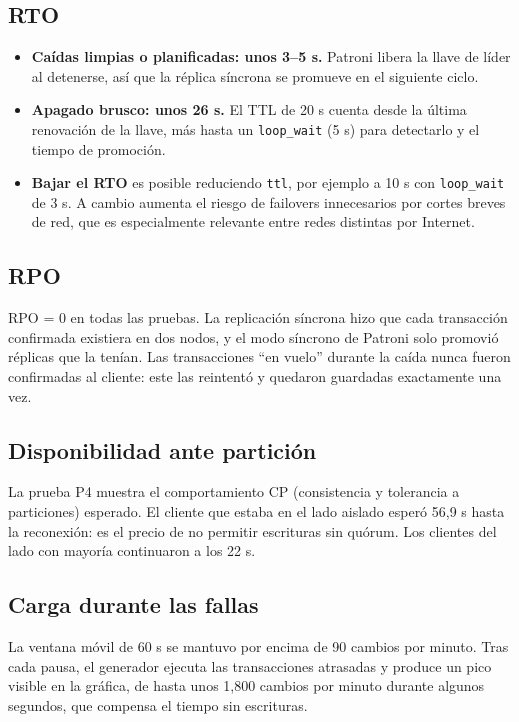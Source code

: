 \documentclass[11pt,a4paper]{article}
\newcommand{\cod}[1]{\texttt{#1}}
\begin{document}
\subsection{RTO}

\begin{itemize}
  \item \textbf{Caídas limpias o planificadas: unos 3--5 s.} Patroni libera la llave de líder al detenerse, así que la réplica síncrona se promueve en el siguiente ciclo.
  \item \textbf{Apagado brusco: unos 26 s.} El TTL de 20 s cuenta desde la última renovación de la llave, más hasta un \cod{loop\_wait} (5 s) para detectarlo y el tiempo de promoción.
  \item \textbf{Bajar el RTO} es posible reduciendo \cod{ttl}, por ejemplo a 10 s con \cod{loop\_wait} de 3 s. A cambio aumenta el riesgo de failovers innecesarios por cortes breves de red, que es especialmente relevante entre redes distintas por Internet.
\end{itemize}

\subsection{RPO}

RPO = 0 en todas las pruebas. La replicación síncrona hizo que cada transacción confirmada existiera en dos nodos, y el modo síncrono de Patroni solo promovió réplicas que la tenían. Las transacciones ``en vuelo'' durante la caída nunca fueron confirmadas al cliente: este las reintentó y quedaron guardadas exactamente una vez.

\subsection{Disponibilidad ante partición}

La prueba P4 muestra el comportamiento CP (consistencia y tolerancia a particiones) esperado. El cliente que estaba en el lado aislado esperó 56,9 s hasta la reconexión: es el precio de no permitir escrituras sin quórum. Los clientes del lado con mayoría continuaron a los 22 s.

\subsection{Carga durante las fallas}

La ventana móvil de 60 s se mantuvo por encima de 90 cambios por minuto. Tras cada pausa, el generador ejecuta las transacciones atrasadas y produce un pico visible en la gráfica, de hasta unos 1,800 cambios por minuto durante algunos segundos, que compensa el tiempo sin escrituras.
\end{document}
